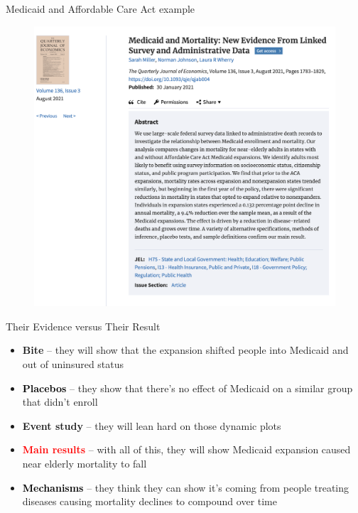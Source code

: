 \documentclass{beamer}
\begin{document}
\begin{frame}{Medicaid and Affordable Care Act example}

\begin{figure}
\includegraphics[scale=0.25]{./lecture_includes/medicaid_qje}
\end{figure}

\end{frame}
\begin{frame}{Their Evidence versus Their Result}

\begin{itemize}
\item \textbf{Bite} -- they will show that the expansion shifted people into Medicaid and out of uninsured status
\item \textcolor{black}{\textbf{Placebos}} -- they show that there's no effect of Medicaid on a similar group that didn't enroll
\item \textbf{Event study} -- they will lean hard on those dynamic plots
\item \textcolor{red}{\textbf{Main results}} -- with all of this, they will show Medicaid expansion caused near elderly mortality to fall
\item \textcolor{black}{\textbf{Mechanisms}} -- they think they can show it's coming from people treating diseases causing mortality declines to compound over time
\end{itemize}

\end{frame}
\end{document}
